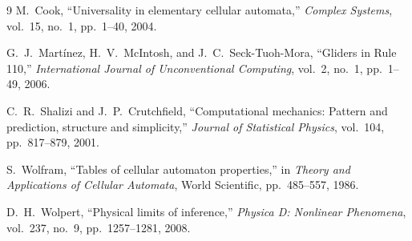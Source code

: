 \documentclass[11pt,a4paper]{article}
\DeclareRobustCommand{\textenglish}[1]{\foreignlanguage{english}{#1}}
\begin{document}
\begin{thebibliography}{9}
\textenglish{M.~Cook, ``Universality in elementary cellular automata,'' \emph{Complex Systems}, vol.~15, no.~1, pp.~1--40, 2004.}

\textenglish{G.~J.~Mart\'inez, H.~V.~McIntosh, and J.~C.~Seck-Tuoh-Mora, ``Gliders in Rule 110,'' \emph{International Journal of Unconventional Computing}, vol.~2, no.~1, pp.~1--49, 2006.}

\textenglish{C.~R.~Shalizi and J.~P.~Crutchfield, ``Computational mechanics: Pattern and prediction, structure and simplicity,'' \emph{Journal of Statistical Physics}, vol.~104, pp.~817--879, 2001.}

\textenglish{S.~Wolfram, ``Tables of cellular automaton properties,'' in \emph{Theory and Applications of Cellular Automata}, World Scientific, pp.~485--557, 1986.}

\textenglish{D.~H.~Wolpert, ``Physical limits of inference,'' \emph{Physica D: Nonlinear Phenomena}, vol.~237, no.~9, pp.~1257--1281, 2008.}
\end{thebibliography}
\end{document}
